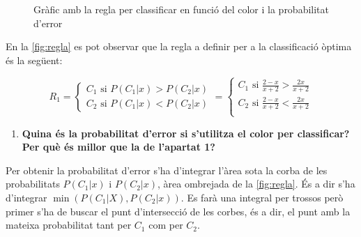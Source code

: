 \documentclass[a4paper]{article}
\begin{document}
\begin{figure}[H]
	\centering
	\caption{Gràfic amb la regla per classificar en funció del color i la probabilitat d'error}
	\label{fig:regla}
\end{figure}

En la \autoref{fig:regla} es pot observar que la regla a definir per a la classificació òptima és la següent:

$$
R_1 = 
\begin{cases}
C_1 \text{ si } P(C_1|x) > P(C_2|x) \\
C_2 \text{ si } P(C_1|x) < P(C_2|x)
\end{cases}
=
\begin{cases}
C_1 \text{ si } \frac{2 - x}{x + 2} > \frac{2x}{x + 2} \\
C_2 \text{ si } \frac{2 - x}{x + 2} < \frac{2x}{x + 2} \\
\end{cases}
$$

\begin{enumerate}[resume]
	\item \textbf{Quina és la probabilitat d'error si s'utilitza el color per classificar? Per què és millor que la de l'apartat 1?}
\end{enumerate}

Per obtenir la probabilitat d'error s'ha d'integrar l'àrea sota la corba de les probabilitats $P(C_1|x)$ i $P(C_2|x)$, àrea ombrejada de la \autoref{fig:regla}. És a dir s'ha d'integrar $\min(P(C_1|X),P(C_2|x))$. Es farà una integral per trossos però primer s'ha de buscar el punt d'intersecció de les corbes, és a dir, el punt amb la mateixa probabilitat tant per $C_1$ com per $C_2$.
\end{document}
